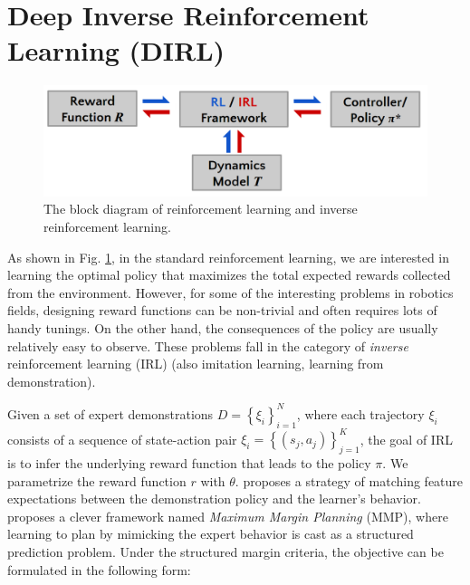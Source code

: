 \documentclass[../thesis.tex]{subfiles}
\begin{document}
 
 
\section{Deep Inverse Reinforcement Learning (DIRL)}
\label{sec:dirl_intro}
 
 
\begin{figure}[b]
      \begin{center}
       \centerline{\includegraphics[width=0.5\columnwidth]{./DIRL/fig/irl_rl_pipeline.png}}
            \caption{The block diagram of reinforcement learning and inverse reinforcement learning.}
            \label{fig:irl_rl}
      \end{center}
\end{figure}
 
As shown in Fig. \ref{fig:irl_rl}, in the standard reinforcement learning, we are interested in learning the optimal policy that maximizes the total expected rewards collected from the environment.
However, for some of the interesting problems in robotics fields, designing reward functions can be non-trivial and often requires lots of handy tunings.
On the other hand, the consequences of the policy are usually relatively easy to observe.
These problems fall in the category of \textit{inverse} reinforcement learning (IRL) \cite{ng2000algorithms} (also imitation learning, learning from demonstration).
 
 
 
Given a set of expert demonstrations $D=\left\{ \xi_i \right\}_{i=1}^{N}$, where each trajectory $\xi_i$ consists of a sequence of state-action pair $\xi_i = \left\{ (s_j, a_j) \right\}_{j=1}^{K}$, the goal of IRL is to infer the underlying reward function that leads to the policy $\pi$.
We parametrize the reward function $r$ with $\theta$. \citet{abbeel2004apprenticeship} proposes a strategy of matching feature expectations between the demonstration policy and the learner's behavior. 
\citet{ratliff2006maximum} proposes a clever framework named \textit{Maximum Margin Planning} (MMP), where learning to plan by mimicking the expert behavior is cast as a structured prediction problem. Under the structured margin criteria, the objective can be formulated in the following form:
 
\end{document}
